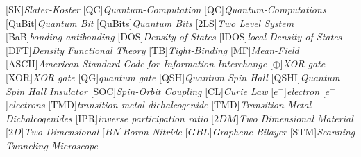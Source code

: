\begin{acronym}[TDMA]
  [SK]{\emph{Slater-Koster}}
  [QC]{\emph{Quantum-Computation}}
  [QC]{\emph{Quantum-Computations}}
  [QuBit]{\emph{Quantum Bit}}
  [QuBits]{\emph{Quantum Bits}}
  [2LS]{\emph{Two Level System}}
  [BaB]{\emph{bonding-antibonding}}
  [DOS]{\emph{Density of States}}
  [lDOS]{\emph{local Density of States}}
  [DFT]{\emph{Density Functional Theory}}
  [TB]{\emph{Tight-Binding}}
  [MF]{\emph{Mean-Field}}
  [ASCII]{\emph{American Standard Code for Information Interchange}}
  [$\oplus$]{\emph{XOR gate}}
  [XOR]{\emph{XOR gate}}
  [QG]{\emph{quantum gate}}
  [QSH]{\emph{Quantum Spin Hall}}
  [QSHI]{\emph{Quantum Spin Hall Insulator}}
  [SOC]{\emph{Spin-Orbit Coupling}}
  [CL]{\emph{Curie Law}}
  [$e^{-}$]{\emph{electron}}
  [$e^{-}$]{\emph{electrons}}
  [TMD]{\emph{transition metal dichalcogenide}}
  [TMD]{\emph{Transition Metal Dichalcogenides}}
  [IPR]{\emph{inverse participation ratio}}
  [$2DM$]{\emph{Two Dimensional Material}}
  [$2D$]{\emph{Two Dimensional}}
  [$BN$]{\emph{Boron-Nitride}}
  [$GBL$]{\emph{Graphene Bilayer}}
  [STM]{\emph{Scanning Tunneling Microscope}}
\end{acronym}

